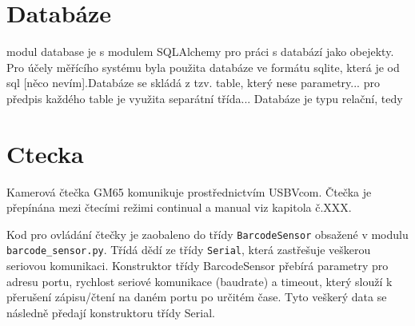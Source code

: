 %
%        


\section{Databáze}

modul database je s modulem SQLAlchemy pro práci s databází jako obejekty. Pro účely měřícího systému byla použita databáze ve formátu sqlite, která je od sql [něco nevím].Databáze se skládá z tzv. table, který nese parametry... pro předpis každého table je využita separátní třída... Databáze je typu relační, tedy 
%




\section{Ctecka}

Kamerová čtečka GM65 komunikuje prostřednictvím USBVcom. Čtečka je přepínána mezi čtecími režimi continual a manual viz kapitola č.XXX. 

Kod pro ovládání čtečky je zaobaleno do třídy \texttt{BarcodeSensor} obsažené v modulu \texttt{barcode\_sensor.py}. Třídá dědí ze třídy \texttt{Serial}, která zastřešuje veškerou seriovou komunikaci. Konstruktor třídy BarcodeSensor přebírá parametry pro adresu portu, rychlost seriové komunikace (baudrate) a timeout, který slouží k přerušení zápisu/čtení na daném portu po určitém čase. Tyto veškerý data se následně předají konstruktoru třídy Serial. 

